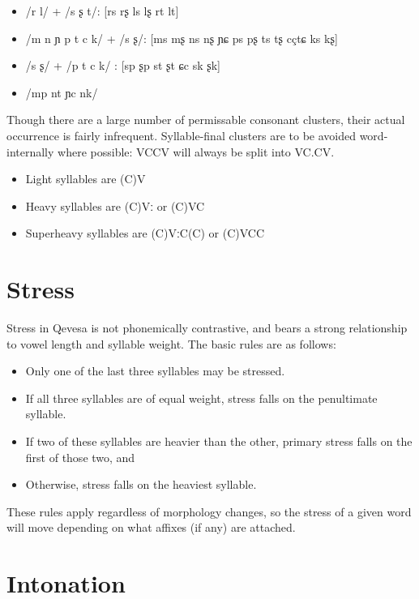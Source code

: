 \documentclass[grammar]{subfiles}
\begin{document}
\begin{itemize}
  \item /r l/ + /s ʂ t/: [rs rʂ ls lʂ rt lt]
  \item /m n ɲ p t c k/ + /s ʂ/: [ms mʂ ns nʂ ɲɕ ps pʂ ts tʂ cç\tlde tɕ ks kʂ]
  \item /s ʂ/ + /p t c k/ : [sp ʂp st ʂt ɕc sk ʂk]
  \item /mp nt ɲc nk/
\end{itemize}

Though there are a large number of permissable consonant clusters, their actual
occurrence is fairly infrequent.  Syllable-final clusters are to be avoided
word-internally where possible: VCCV will always be split into VC.CV\@. 

\begin{itemize}
  \item Light syllables are (C)V
  \item Heavy syllables are (C)Vː or (C)VC
  \item Superheavy syllables are (C)VːC(C) or (C)VCC
\end{itemize}

\section{Stress}
\label{sec:stress}

Stress in Qevesa is not phonemically contrastive, and bears a strong
relationship to vowel length and syllable weight.  The basic rules are as
follows: 

\begin{itemize}
  \item Only one of the last three syllables may be stressed.
  \item If all three syllables are of equal weight, stress falls on the penultimate syllable.
  \item If two of these syllables are heavier than the other, primary stress falls on the first of those two, and 
  \item Otherwise, stress falls on the heaviest syllable.
\end{itemize}

These rules apply regardless of morphology changes, so the stress of a given
word will move depending on what affixes (if any) are attached.

\section{Intonation}
\label{sec:intonation}
\end{document}
